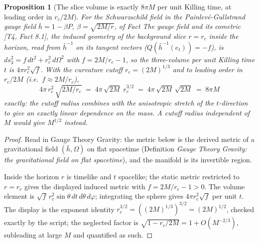 \documentclass[11pt]{article}
\newtheorem{proposition}[theorem]{Proposition}
\theoremstyle{definition}
\theoremstyle{plain}
\newcommand{\changedmark}[2]{\marginpar{\raggedright\scriptsize\color{#1}#2}}
\providecommand{\hb}{}\renewcommand{\hb}{\bar{h}}
\begin{document}
\begin{proposition}[The slice volume is exactly $8\pi M$ per unit Killing time, at leading order in $r_c/2M$]\label{c:scrambling.slice-volume-exactly-per-unit-killing}
\changedmark{gray}{reworded}
For the Schwarzschild field in the Painlev\'e-Gullstrand gauge field $\hb = 1 - \beta P$, $\beta = \sqrt{2M/r}$, of Fact \emph{The gauge field and its cometric} [T4, Fact 8.1], the induced geometry of the background slice $r = r_c$ inside the horizon, read from $\hb^{-1}$ on its tangent vectors ($Q(\hb^{-1}(e_t)) = -f$), is $ds_3^2 = f\,dt^2 + r_c^2\,d\Omega^2$ with $f = 2M/r_c - 1$, so the three-volume per unit Killing time $t$ is $4\pi r_c^2\sqrt{f}$. With the curvature cutoff $r_c = (2M)^{1/3}$ and to leading order in $r_c/2M$ (i.e.\ $f \approx 2M/r_c$),
\[
4\pi\,r_c^2\,\sqrt{2M/r_c} \;=\; 4\pi\,\sqrt{2M}\;r_c^{3/2} \;=\; 4\pi\,\sqrt{2M}\,\sqrt{2M} \;=\; 8\pi M
\]
\emph{exactly}: the cutoff radius combines with the anisotropic stretch of the $t$-direction to give an exactly linear dependence on the mass. A cutoff radius independent of $M$ would give $M^{1/2}$ instead.
\end{proposition}
\begin{proof}
Read in Gauge Theory Gravity: the metric below is the derived metric of a gravitational field $(\hb, \Omega)$ on flat spacetime (Definition \emph{Gauge Theory Gravity: the gravitational field on flat spacetime}), and the manifold is its invertible region.

Inside the horizon $r$ is timelike and $t$ spacelike; the static metric restricted to $r = r_c$ gives the displayed induced metric with $f = 2M/r_c - 1 > 0$. The volume element is $\sqrt{f}\,r_c^2\sin\theta\,dt\,d\theta\,d\varphi$; integrating the sphere gives $4\pi r_c^2\sqrt f$ per unit $t$. The display is the exponent identity $r_c^{3/2} = ((2M)^{1/3})^{3/2} = (2M)^{1/2}$, checked exactly by the script; the neglected factor is $\sqrt{1 - r_c/2M} = 1 + O(M^{-2/3})$, subleading at large $M$ and quantified as such.

\end{proof}
\end{document}
